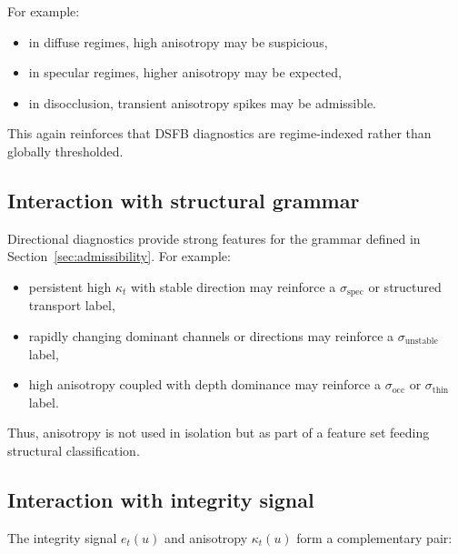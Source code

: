 \documentclass[11pt]{article}
\theoremstyle{definition}
\theoremstyle{plain}
\begin{document}
For example:
\begin{itemize}[leftmargin=1.5em]
    \item in diffuse regimes, high anisotropy may be suspicious,
    \item in specular regimes, higher anisotropy may be expected,
    \item in disocclusion, transient anisotropy spikes may be admissible.
\end{itemize}

This again reinforces that DSFB diagnostics are regime-indexed rather than globally thresholded.


\subsection{Interaction with structural grammar}

Directional diagnostics provide strong features for the grammar defined in Section~\ref{sec:admissibility}. For example:

\begin{itemize}[leftmargin=1.5em]
    \item persistent high $\kappa_t$ with stable direction may reinforce a $\sigma_{\mathrm{spec}}$ or structured transport label,
    \item rapidly changing dominant channels or directions may reinforce a $\sigma_{\mathrm{unstable}}$ label,
    \item high anisotropy coupled with depth dominance may reinforce a $\sigma_{\mathrm{occ}}$ or $\sigma_{\mathrm{thin}}$ label.
\end{itemize}

Thus, anisotropy is not used in isolation but as part of a feature set feeding structural classification.


\subsection{Interaction with integrity signal}

The integrity signal $e_t(u)$ and anisotropy $\kappa_t(u)$ form a complementary pair:
\end{document}
